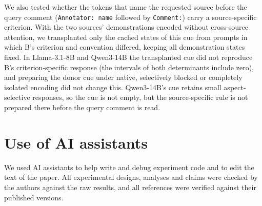 We also tested whether the tokens that name the requested source before the query comment (\texttt{Annotator: name} followed by \texttt{Comment:}) carry a source-specific criterion.
With the two sources' demonstrations encoded without cross-source attention, we transplanted only the cached states of this cue from prompts in which B's criterion and convention differed, keeping all demonstration states fixed.
In Llama-3.1-8B and Qwen3-14B the transplanted cue did not reproduce B's criterion-specific response (the intervals of both determinants include zero), and preparing the donor cue under native, selectively blocked or completely isolated encoding did not change this.
Qwen3-14B's cue retains small aspect-selective responses, so the cue is not empty, but the source-specific rule is not prepared there before the query comment is read.

\section{Use of AI assistants}
\label{app:ai}
We used AI assistants to help write and debug experiment code and to edit the text of the paper. All experimental designs, analyses and claims were checked by the authors against the raw results, and all references were verified against their published versions.
